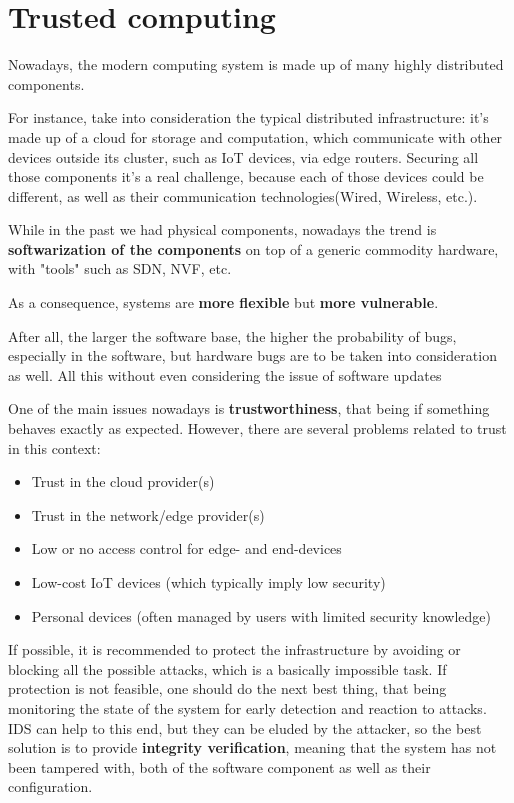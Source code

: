 \chapter{Trusted computing}
Nowadays, the modern computing system is made up of many highly
distributed components.

For instance, take into consideration the typical distributed
infrastructure: it's made up of a cloud for storage and computation,
which communicate with other devices outside its cluster, such as IoT
devices, via edge routers. Securing all those components it's a real
challenge, because each of those devices could be different, as well
as their communication technologies(Wired, Wireless, etc.). 

While in the past we had physical components, nowadays the trend is
\textbf{softwarization of the components} on top of a generic
commodity hardware, with "tools" such as SDN, NVF, etc.
\begin{boxH}
  As a consequence, systems are \textbf{more flexible} but
  \textbf{more vulnerable}.
\end{boxH}
After all, the larger the software base, the higher the probability of
bugs, especially in the software, but hardware bugs are to be taken 
into consideration as well. All this without even considering the
issue of software updates

One of the main issues nowadays is \textbf{trustworthiness}, that being if
something behaves exactly as expected. However, there are several problems
related to trust in this context:

\begin{itemize}
    \item Trust in the cloud provider(s)
    \item Trust in the network/edge provider(s)
    \item Low or no access control for edge- and end-devices
    \item Low-cost IoT devices (which typically imply low security)
    \item Personal devices (often managed by users with limited 
          security knowledge)
\end{itemize}

If possible, it is recommended to protect the infrastructure by
avoiding or blocking all the possible attacks, which is a basically
impossible task. If protection is not feasible, one should do the next
best thing, that being monitoring the state of the system for early
detection and reaction to attacks. IDS can help to this end, but they
can be eluded by the attacker, so the best solution is to provide 
\textbf{integrity verification}, meaning that the system has not been
tampered with, both of the software component as well as their
configuration.

